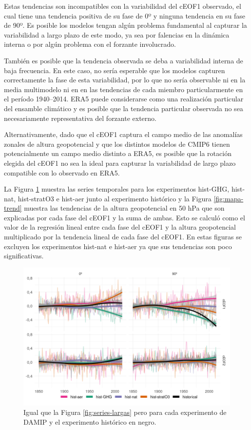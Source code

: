 \documentclass[12pt,oneside,a4paper]{reedthesis}
\begin{document}
Estas tendencias son incompatibles con la variabilidad del cEOF1 observado, el cual tiene una tendencia positiva de su fase de 0º y ninguna tendencia en su fase de 90º.
Es posible los modelos tengan algún problema fundamental al capturar la variabilidad a largo plazo de este modo, ya sea por falencias en la dinámica interna o por algún problema con el forzante involucrado.

También es posible que la tendencia observada se deba a variabilidad interna de baja frecuencia.
En este caso, no sería esperable que los modelos capturen correctamente la fase de esta variabilidad, por lo que no sería observable ni en la media multimodelo ni en en las tendencias de cada miembro particularmente en el período 1940--2014.
ERA5 puede considerarse como una realización particular del ensamble climático y es posible que la tendencia particular observada no sea necesariamente representativa del forzante externo.

Alternativamente, dado que el cEOF1 captura el campo medio de las anomalías zonales de altura geopotencial y que los distintos modelos de CMIP6 tienen potencialmente un campo medio distinto a ERA5, es posible que la rotación elegida del cEOF1 no sea la ideal para capturar la variabilidad de largo plazo compatible con lo observado en ERA5.

La Figura \ref{fig:ceof-damip} muestra las series temporales para los experimentos hist-GHG, hist-nat, hist-stratO3 e hist-aer junto al experimento histórico y la Figura \ref{fig:mapa-trend} muestra las tendencias de la altura geopotencial en 50 hPa que son explicadas por cada fase del cEOF1 y la suma de ambas.
Esto se calculó como el valor de la regresión lineal entre cada fase del cEOF1 y la altura geopotencial multiplicado por la tendencia lineal de cada fase del cEOF1.
En estas figuras se excluyen los experimentos hist-nat e hist-aer ya que sus tendencias son poco significativas.

\begin{figure}

{\centering \includegraphics{figures/50-cmip6/ceof-damip-1} 

}

\caption{Igual que la Figura \ref{fig:series-largas} pero para cada experimento de DAMIP y el experimento histórico en negro.}\label{fig:ceof-damip}
\end{figure}
\end{document}

